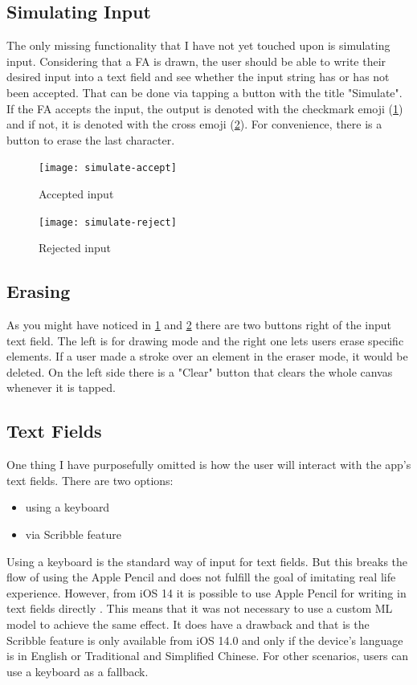 \subsection{Simulating Input}

The only missing functionality that I have not yet touched upon is simulating input. Considering that a FA is drawn, the user should be able to write their desired input into a text field and see whether the input string has or has not been accepted. That can be done via tapping a button with the title "Simulate". If the FA accepts the input, the output is denoted with the checkmark emoji (\ref{simulate-accept}) and if not, it is denoted with the cross emoji (\ref{simulate-reject}). For convenience, there is a button to erase the last character.

\begin{figure}
    \texttt{[image: simulate-accept]}
    \caption{Accepted input}\label{simulate-accept}
\end{figure}

\begin{figure}
    \texttt{[image: simulate-reject]}
    \caption{Rejected input}\label{simulate-reject}
\end{figure}

\subsection{Erasing}

As you might have noticed in \ref{simulate-accept} and \ref{simulate-reject} there are two buttons right of the input text field. The left is for drawing mode and the right one lets users erase specific elements. If a user made a stroke over an element in the eraser mode, it would be deleted. On the left side there is a "Clear" button that clears the whole canvas whenever it is tapped.

\subsection{Text Fields}

One thing I have purposefully omitted is how the user will interact with the app's text fields. There are two options:
\begin{itemize}
    \item using a keyboard
    \item via Scribble feature
\end{itemize}

Using a keyboard is the standard way of input for text fields. But this breaks the flow of using the Apple Pencil and does not fulfill the goal of imitating real life experience. However, from iOS 14 it is possible to use Apple Pencil for writing in text fields directly \cite{scribble}. This means that it was not necessary to use a custom ML model to achieve the same effect. It does have a drawback and that is the Scribble feature is only available from iOS 14.0 and only if the device's language is in English or Traditional and Simplified Chinese. For other scenarios, users can use a keyboard as a fallback.

